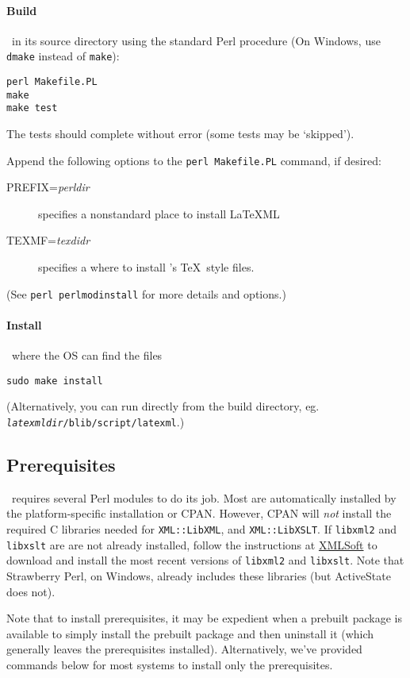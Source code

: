 \documentclass{article}
\begin{document}
\paragraph*{Build}
\LaTeXML\ in its source directory using the standard Perl procedure
(On Windows, use \texttt{dmake} instead of \texttt{make}):
\begin{lstlisting}[style=shell]
perl Makefile.PL
make
make test
\end{lstlisting}
The tests should complete without error (some tests may be `skipped').

Append the following options to the \texttt{perl Makefile.PL} command, if desired:
\begin{description}
\item[PREFIX=\textit{perldir}] specifies a nonstandard place to install LaTeXML
\item[TEXMF=\textit{texdidr}] specifies a where to install \LaTeXML's \TeX\ style files.
\end{description}
(See \texttt{perl perlmodinstall} for more details and options.)

\paragraph*{Install} \LaTeXML\ where the OS can find the files
\begin{lstlisting}[style=shell]
sudo make install
\end{lstlisting}
(Alternatively, you can run directly from the build directory, eg.
\texttt{\textit{latexmldir}/blib/script/latexml}.)

\subsection{Prerequisites}\label{get.prerequisites}
\LaTeXML\ requires several Perl modules to do its job.  Most
are automatically installed by the platform-specific installation or CPAN.
However, CPAN will \emph{not} install the required C libraries needed for
\texttt{XML::LibXML}, and \texttt{XML::LibXSLT}.
If \texttt{libxml2} and \texttt{libxslt} are are not already installed,
follow the instructions at \href{http://www.xmlsoft.org}{XMLSoft} to
download and install the most recent versions of \texttt{libxml2} and \texttt{libxslt}.
Note that Strawberry Perl, on Windows, already includes these libraries
(but ActiveState does not).

Note that to install prerequisites, it may be expedient
when a prebuilt package is available to simply install the prebuilt
package and then uninstall it (which generally leaves the prerequisites installed).
Alternatively, we've provided commands below for most systems
to install only the prerequisites.
\end{document}
